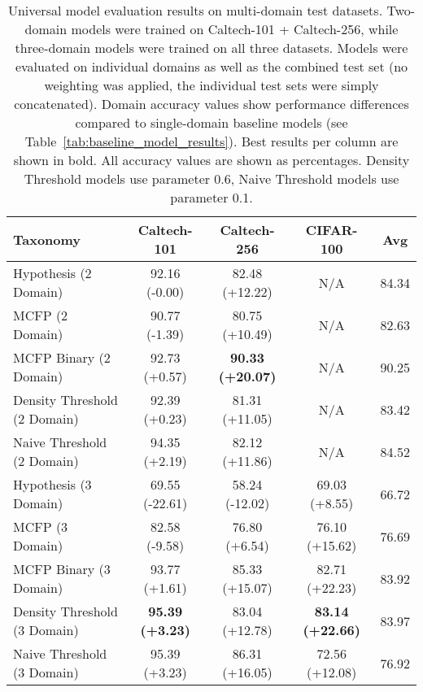 \begin{table}[ht]
\centering
\caption{Universal model evaluation results on multi-domain test datasets. Two-domain models were trained on Caltech-101 + Caltech-256, while three-domain models were trained on all three datasets. Models were evaluated on individual domains as well as the combined test set (no weighting was applied, the individual test sets were simply concatenated). Domain accuracy values show performance differences compared to single-domain baseline models (see Table~\ref{tab:baseline_model_results}). Best results per column are shown in bold. All accuracy values are shown as percentages. Density Threshold models use parameter 0.6, Naive Threshold models use parameter 0.1.}
\label{tab:universal_model_results}
\begin{tabular}{lcccc}
\toprule
Taxonomy & Caltech-101 & Caltech-256 & CIFAR-100 & Avg \\
\midrule
Hypothesis (2 Domain) & 92.16 (-0.00) & 82.48 (+12.22) & N/A & 84.34 \\
MCFP (2 Domain) & 90.77 (-1.39) & 80.75 (+10.49) & N/A & 82.63 \\
MCFP Binary (2 Domain) & 92.73 (+0.57) & \textbf{90.33 (+20.07)} & N/A & 90.25 \\
Density Threshold (2 Domain) & 92.39 (+0.23) & 81.31 (+11.05) & N/A & 83.42 \\
Naive Threshold (2 Domain) & 94.35 (+2.19) & 82.12 (+11.86) & N/A & 84.52 \\
Hypothesis (3 Domain) & 69.55 (-22.61) & 58.24 (-12.02) & 69.03 (+8.55) & 66.72 \\
MCFP (3 Domain) & 82.58 (-9.58) & 76.80 (+6.54) & 76.10 (+15.62) & 76.69 \\
MCFP Binary (3 Domain) & 93.77 (+1.61) & 85.33 (+15.07) & 82.71 (+22.23) & 83.92 \\
Density Threshold (3 Domain) & \textbf{95.39 (+3.23)} & 83.04 (+12.78) & \textbf{83.14 (+22.66)} & 83.97 \\
Naive Threshold (3 Domain) & 95.39 (+3.23) & 86.31 (+16.05) & 72.56 (+12.08) & 76.92 \\
\bottomrule
\end{tabular}
\end{table}
